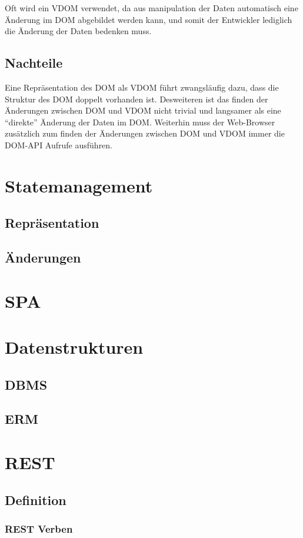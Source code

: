 Oft wird ein \ac{VDOM} verwendet, da aus manipulation der Daten automatisch eine
Änderung im \ac{DOM} abgebildet werden kann, und somit der Entwickler lediglich
die Änderung der Daten bedenken muss.

\subsection{Nachteile}

Eine Repräsentation des \ac{DOM} als \ac{VDOM} führt zwangsläufig dazu, dass die
Struktur des \ac{DOM} doppelt vorhanden ist. Desweiteren ist das finden der
Änderungen zwischen \ac{DOM} und \ac{VDOM} nicht trivial und langsamer als eine
``direkte'' Änderung der Daten im \ac{DOM}. Weiterhin muss der Web-Browser
zusätzlich zum finden der Änderungen zwischen \ac{DOM} und \ac{VDOM} immer
die \ac{DOM}-\ac{API} Aufrufe ausführen.

\section{Statemanagement}
\subsection{Repräsentation}
\subsection{Änderungen}
\section{\acl{SPA}}
\section{Datenstrukturen}
\subsection{\acl{DBMS}}
\subsection{\acl{ERM}}
\section{\acl{REST}}
\subsection{Definition}
\subsubsection{\acs{REST} Verben}
